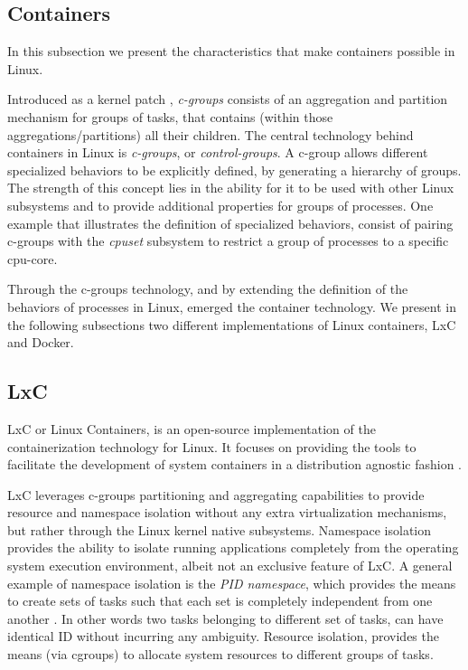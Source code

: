 \documentclass[12pt, titlepage]{uo_temp}
\begin{document}
     \subsection{Containers}\label{bkg_cgroup}
     In this subsection we present the characteristics that make containers possible in
     Linux.

     Introduced as a kernel patch \cite{cgroups}, \emph{c-groups} consists of an
     aggregation and partition mechanism for groups of tasks, that contains (within those
     aggregations/partitions) all their children. The central technology behind containers
     in Linux is \emph{c-groups}, or \emph{control-groups}. A c-group allows different
     specialized behaviors to be explicitly defined, by generating a hierarchy of
     groups. The strength of this concept lies in the ability for it to be used with other
     Linux subsystems and to provide additional properties for groups of processes.  One
     example that illustrates the definition of specialized behaviors, consist of pairing
     c-groups with the \emph{cpuset} subsystem to restrict a group of processes to a
     specific \gls{cpu}-core.

     Through the c-groups technology, and by extending the definition of the behaviors of
     processes in Linux, emerged the container technology. We present in the following
     subsections two different implementations of Linux containers, LxC and Docker.

     \subsection{LxC}
     LxC or Linux Containers, is an open-source implementation of the containerization
     technology for Linux. It focuses on providing the tools to facilitate the development
     of system containers in a distribution agnostic fashion \cite{lxc}.
     
     LxC leverages c-groups partitioning and aggregating capabilities to provide resource
     and namespace isolation without any extra virtualization mechanisms, but rather
     through the Linux kernel native subsystems. Namespace isolation provides the ability
     to isolate running applications completely from the operating system execution
     environment, albeit not an exclusive feature of LxC. A general example of namespace
     isolation is the \emph{PID namespace}, which provides the means to create sets of
     tasks such that each set is completely independent from one another
     \cite{emelyanov2007pid}. In other words two tasks belonging to different set of
     tasks, can have identical ID without incurring any ambiguity.  Resource isolation,
     provides the means (via cgroups) to allocate system resources to different groups of
     tasks.
\end{document}
